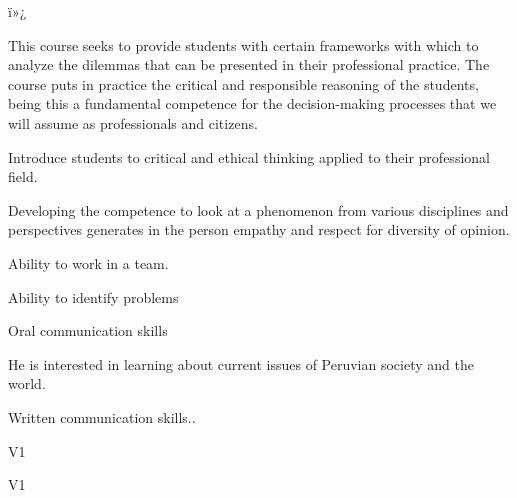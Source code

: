 ï»¿\begin{syllabus}


\begin{justification}
This course seeks to provide students with certain frameworks with which to analyze the dilemmas that can be presented in their professional practice. The course puts in practice the critical and responsible reasoning of the students, being this a fundamental competence for the decision-making processes that we will assume as professionals and citizens.
\end{justification}

\begin{goals}
\item Introduce students to critical and ethical thinking applied to their professional field.
\item Developing the competence to look at a phenomenon from various disciplines and perspectives generates in the person empathy and respect for diversity of opinion.
\item Ability to work in a team.
\item Ability to identify problems
\item Oral communication skills
\item He is interested in learning about current issues of Peruvian society and the world.
\item Written communication skills..
\end{goals}

\begin{outcomes}{V1}
    \item {}
    \item {}
    \item {}
    \item {}
    \item {}
\end{outcomes}

\begin{competences}{V1}
    \item {}
    \item {}
    \item {}
    \item {}
\end{competences}


\end{syllabus}
